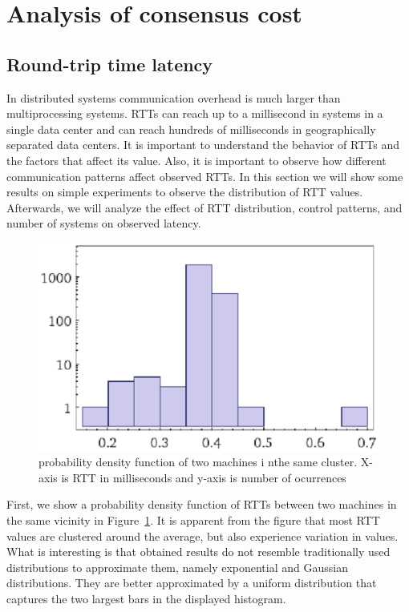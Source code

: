 \section{Analysis of consensus cost}\label{sec:analysis}


\subsection{Round-trip time latency}
In distributed systems communication overhead is much larger than multiprocessing systems. RTTs can reach up to a millisecond in systems in a single data center and can reach hundreds of milliseconds in geographically separated data centers. It is important to understand the behavior of RTTs and the factors that affect its value. Also, it is important to observe how different communication patterns affect observed RTTs. In this section we will show some results on simple experiments to observe the distribution of RTT values. Afterwards, we will analyze the effect of RTT distribution, control patterns, and number of systems on observed latency.

\begin{figure}[h]
\centering
\includegraphics[scale=0.5]{img/rttpdf2.eps}
\caption{probability density function of two machines i nthe same cluster. X-axis is RTT in milliseconds and y-axis is number of ocurrences}
\label{fig:rttpdf}
\end{figure}

First, we show a probability density function of RTTs between two machines in the same vicinity in Figure~\ref{fig:rttpdf}. It is apparent from the figure that most RTT values are clustered around the average, but also experience variation in values. What is interesting is that obtained results do not resemble traditionally used distributions to approximate them, namely exponential and Gaussian distributions. They are better approximated by a uniform distribution that captures the two largest bars in the displayed histogram.

